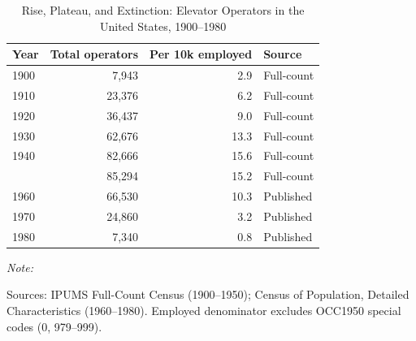 \begin{table}[!h]
\centering
\caption{Rise, Plateau, and Extinction: Elevator Operators in the United States, 1900--1980}
\centering
\begin{threeparttable}
\begin{tabular}[t]{lrrl}
\toprule
Year & Total operators & Per 10k employed & Source\\
\midrule
1900 & 7,943 & 2.9 & Full-count\\
1910 & 23,376 & 6.2 & Full-count\\
1920 & 36,437 & 9.0 & Full-count\\
1930 & 62,676 & 13.3 & Full-count\\
1940 & 82,666 & 15.6 & Full-count\\
\addlinespace
1950 & 85,294 & 15.2 & Full-count\\
1960 & 66,530 & 10.3 & Published\\
1970 & 24,860 & 3.2 & Published\\
1980 & 7,340 & 0.8 & Published\\
\bottomrule
\end{tabular}
\begin{tablenotes}
\item \textit{Note: } 
\item Sources: IPUMS Full-Count Census (1900--1950); Census of Population, Detailed Characteristics (1960--1980). Employed denominator excludes OCC1950 special codes (0, 979--999).
\end{tablenotes}
\end{threeparttable}
\end{table}
